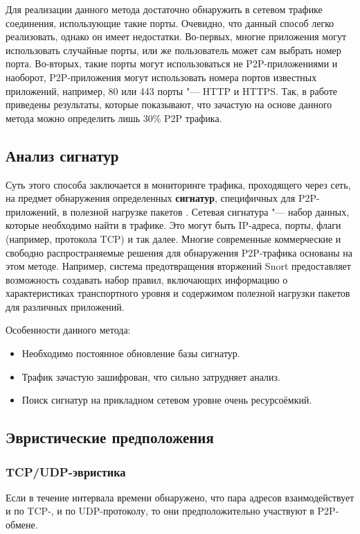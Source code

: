 \documentclass[bachelor, och, coursework]{SCWorks}
\begin{document}
Для реализации данного метода достаточно обнаружить в сетевом трафике соединения, использующие такие порты.
Очевидно, что данный способ легко реализовать, однако он имеет недостатки. Во-первых, многие приложения могут
использовать случайные порты, или же пользователь может сам выбрать номер порта. Во-вторых, такие порты могут использоваться не P2P-приложениями и наоборот, P2P-приложения могут использовать номера портов известных приложений, например, 80 или 443 порты "--- HTTP и HTTPS. Так, в работе \cite{30percent}
приведены результаты, которые показывают, что зачастую на основе данного метода можно определить лишь 30\% P2P трафика.

\subsection{Анализ сигнатур}
Суть этого способа заключается в мониторинге трафика, проходящего через сеть, 
на предмет обнаружения определенных \textbf{сигнатур}, специфичных для P2P-приложений, в полезной нагрузке пакетов \cite{seclab}.
Сетевая сигнатура "--- набор данных, которые необходимо найти в трафике. Это могут быть IP-адреса, порты, флаги (например, протокола TCP) и так далее. Многие современные коммерческие и свободно распространяемые решения для обнаружения P2P-трафика основаны на этом методе. Например, система предотвращения вторжений Snort предоставляет возможность создавать набор правил, включающих информацию о характеристиках транспортного уровня и содержимом полезной нагрузки пакетов для различных приложений. 

Особенности данного метода:
\begin{itemize}
    \item Необходимо постоянное обновление базы сигнатур.
    \item Трафик зачастую зашифрован, что сильно затрудняет анализ.
    \item Поиск сигнатур на прикладном сетевом уровне очень ресурсоёмкий.
\end{itemize}

\subsection{Эвристические предположения}

\subsubsection{TCP/UDP-эвристика}
Если в течение интервала времени обнаружено, что пара адресов взаимодействует и по TCP-, и по UDP-протоколу, то они
предположительно участвуют в P2P-обмене.
\end{document}
